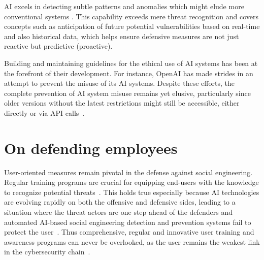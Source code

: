 
AI excels in detecting subtle patterns and anomalies which might elude more conventional systems \citep{fakhouri_AI_Driven_Solutions_SE_Attacks_2024}. This capability exceeds mere threat recognition and covers concepts such as anticipation of future potential vulnerabilities based on real-time and also historical data, which helps ensure defensive measures are not just reactive but predictive (proactive).



Building and maintaining guidelines for the ethical use of AI systems has been at the forefront of their development. For instance, OpenAI has made strides in an attempt to prevent the misuse of its AI systems. Despite these efforts, the complete prevention of AI system misuse remains yet elusive, particularly since older versions without the latest restrictions might still be accessible, either directly or via API calls~\citep{gupta_From_ChatGPT_to_ThreatGPT_2023}.

\section{On defending employees}
\begin{comment}
\end{comment}

User-oriented measures remain pivotal in the defense against social engineering. Regular training programs are crucial for equipping end-users with the knowledge to recognize potential threats~\citep{hadnagy_Social_Engineering_The_Science_2018}. This holds true especially because AI technologies are evolving rapidly on both the offensive and defensive sides, leading to a situation where the threat actors are one step ahead of the defenders and automated AI-based social engineering detection and prevention systems fail to protect the user~\citep{fakhouri_AI_Driven_Solutions_SE_Attacks_2024}. Thus comprehensive, regular and innovative user training and awareness programs can never be overlooked, as the user remains the weakest link in the cybersecurity chain~\citep{mitnick_The_Art_of_Deception_2003}.

